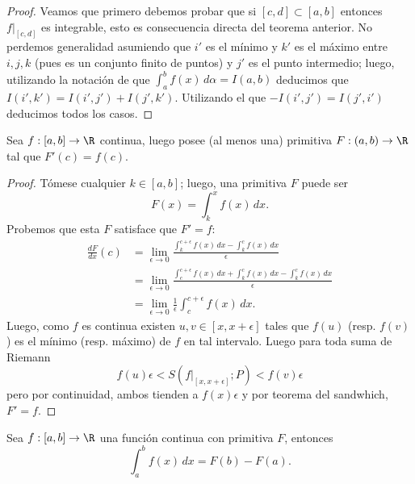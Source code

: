 \documentclass[11pt,oneside,a4paper]{book}
\begin{document}
\begin{proof}
Veamos que primero debemos probar que si $[c,d]\subset[a,b]$ entonces $f|_{[c,d]}$ es integrable, esto es consecuencia directa del teorema anterior. No perdemos generalidad asumiendo que $i'$ es el mínimo y $k'$ es el máximo entre $i,j,k$ (pues es un conjunto finito de puntos) y $j'$ es el punto intermedio; luego, utilizando la notación de que $\int_a^b f(x)\,d\alpha=I(a,b)$ deducimos que $I(i',k')=I(i',j')+I(j',k')$. Utilizando el que $-I(i',j')=I(j',i')$ deducimos todos los casos.
\end{proof}
\begin{thm}
Sea $f:[a,b]\rightarrow\R$ continua, luego posee (al menos una) primitiva $F:(a,b)\rightarrow\R$ tal que $F'(c)=f(c)$.
\end{thm}
\begin{proof}
Tómese cualquier $k\in[a,b]$; luego, una primitiva $F$ puede ser
$$F(x)=\int_k^xf(x)\,dx.$$
Probemos que esta $F$ satisface que $F'=f$:
\begin{align*}
\frac{dF}{dx}(c)&=\lim_{\epsilon\to0}\frac{\int_k^{c+\epsilon}f(x)\,dx-\int_k^cf(x)\,dx}{\epsilon}\\
&=\lim_{\epsilon\to0}\frac{\int_c^{c+\epsilon}f(x)\,dx+\int_k^cf(x)\,dx-\int_k^cf(x)\,dx}{\epsilon}\\
&=\lim_{\epsilon\to0}\frac{1}{\epsilon}\int_c^{c+\epsilon}f(x)\,dx.
\end{align*}
Luego, como $f$ es continua existen $u,v\in[x,x+\epsilon]$ tales que $f(u)$ (resp. $f(v)$) es el mínimo (resp. máximo) de $f$ en tal intervalo. Luego para toda suma de Riemann
$$f(u)\epsilon\lt S(f|_{[x,x+\epsilon]};P)\lt f(v)\epsilon$$
pero por continuidad, ambos tienden a $f(x)\epsilon$ y por teorema del sandwhich, $F'=f$.
\end{proof}
\begin{thm}
Sea $f:[a,b]\rightarrow\R$ una función continua con primitiva $F$, entonces
\begin{equation}
\int_a^b f(x)\,dx=F(b)-F(a).
\end{equation}
\end{thm}
\end{document}
